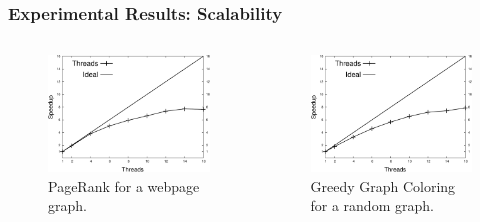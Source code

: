 \documentclass{beamer}
\begin{document}
\begin{frame}[fragile]
   \frametitle{Experimental Results: Scalability}
   \begin{columns}[t]
      \begin{figure}[b]
         \includegraphics[width=\textwidth]{../speedup_pagerank-search_engines.pdf}
         \caption{PageRank for a webpage graph.}
      \end{figure}
      \begin{figure}[b]
         \includegraphics[width=\textwidth]{../speedup_greedy-graph-coloring-2000.pdf}
         \caption{Greedy Graph Coloring for a random graph.}
      \end{figure}
   \end{columns}
\end{frame}
\end{document}
